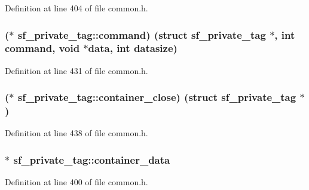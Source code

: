 Definition at line 404 of file common.\+h.

\subsubsection[{\texorpdfstring{command}{command}}]{($\ast$ sf\+\_\+private\+\_\+tag\+::command) (struct {\bf sf\+\_\+private\+\_\+tag} $\ast$, {\bf int} command, {\bf void} $\ast${\bf data}, {\bf int} datasize)}\hypertarget{structsf__private__tag_a7303acd2f12402fa584c71e54395da28}{}\label{structsf__private__tag_a7303acd2f12402fa584c71e54395da28}


Definition at line 431 of file common.\+h.

\subsubsection[{\texorpdfstring{container\+\_\+close}{container_close}}]{($\ast$ sf\+\_\+private\+\_\+tag\+::container\+\_\+close) (struct {\bf sf\+\_\+private\+\_\+tag} $\ast$)}\hypertarget{structsf__private__tag_af651f92f5e5c247a4f0d11fbc9b5c9c1}{}\label{structsf__private__tag_af651f92f5e5c247a4f0d11fbc9b5c9c1}


Definition at line 438 of file common.\+h.

\subsubsection[{\texorpdfstring{container\+\_\+data}{container_data}}]{$\ast$ sf\+\_\+private\+\_\+tag\+::container\+\_\+data}\hypertarget{structsf__private__tag_a341b979e324bee0c7ed22304ef7ac4bb}{}\label{structsf__private__tag_a341b979e324bee0c7ed22304ef7ac4bb}


Definition at line 400 of file common.\+h.

